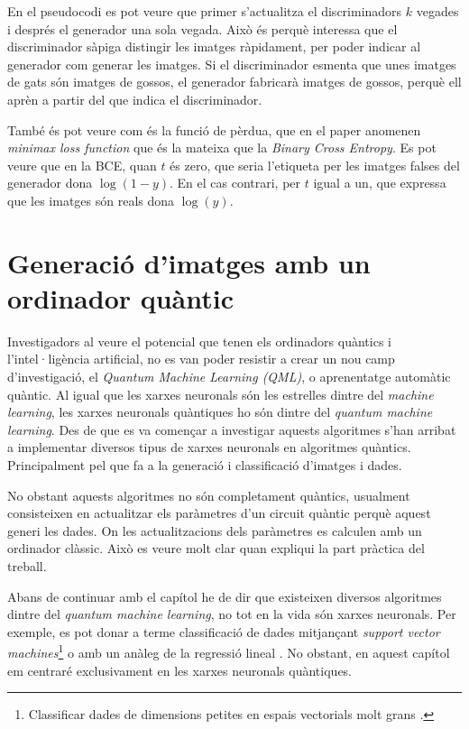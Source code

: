 En el pseudocodi es pot veure que primer s'actualitza el discriminadors $k$ vegades i després  el generador una sola vegada. Això és perquè interessa que el discriminador sàpiga distingir les imatges ràpidament, per poder indicar al generador com generar les imatges. Si el discriminador esmenta que unes imatges de gats són imatges de gossos, el generador fabricarà imatges de gossos, perquè ell aprèn a partir del que indica el discriminador.

També és pot veure com és la funció de pèrdua, que en el paper anomenen \textit{minimax loss function} que és la mateixa que la \textit{Binary Cross Entropy}. Es pot veure que en la BCE, quan $t$ és zero, que seria l'etiqueta per les imatges falses del generador dona $\log(1-y)$. En el cas contrari, per $t$ igual a un, que expressa que les imatges són reals dona $\log(y)$.  


\chapter{Generació d'imatges amb un ordinador quàntic}

Investigadors al veure el potencial que tenen els ordinadors quàntics i l'intel·ligència artificial, no es van poder resistir a crear un nou camp d'investigació, el \textit{Quantum Machine Learning (QML)}, o aprenentatge automàtic quàntic. Al igual que les xarxes neuronals són les estrelles dintre del \textit{machine learning}, les xarxes neuronals quàntiques ho són dintre del \textit{quantum machine learning}. Des de que es va començar a investigar aquests algoritmes s'han arribat a implementar diversos tipus de xarxes neuronals en algoritmes quàntics. Principalment pel que fa a la generació i classificació d'imatges i dades.

No obstant aquests algoritmes no són completament quàntics, usualment consisteixen en actualitzar els paràmetres d'un circuit quàntic perquè aquest generi les dades. On les actualitzacions dels paràmetres es calculen amb un ordinador clàssic. Això es veure molt clar quan expliqui la part pràctica del treball. 

Abans de continuar amb el capítol he de dir que existeixen diversos algoritmes dintre del \textit{quantum machine learning}, no tot en la vida són xarxes neuronals. Per exemple, es pot donar a terme classificació de dades mitjançant \textit{support vector machines}\footnote{Classificar dades de dimensions petites en espais vectorials molt grans \cite{QSVM_2019, QSVM_xanadu_2019}.} o amb un anàleg de la regressió lineal \cite{Q_linear_regression_xanadu}. No obstant, en aquest capítol em centraré exclusivament en les xarxes neuronals quàntiques.

